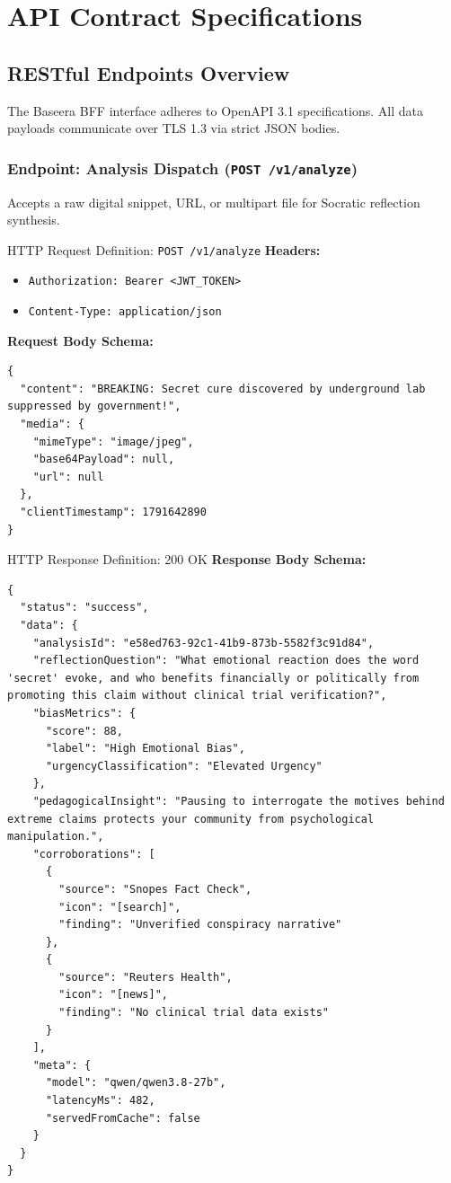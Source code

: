 \documentclass[11pt,a4paper]{report}
\begin{document}
\chapter{API Contract Specifications}

\section{RESTful Endpoints Overview}
The Baseera BFF interface adheres to OpenAPI 3.1 specifications. All data payloads communicate over TLS 1.3 via strict JSON bodies.

\subsection{Endpoint: Analysis Dispatch (\texttt{POST /v1/analyze})}
Accepts a raw digital snippet, URL, or multipart file for Socratic reflection synthesis.

\begin{calloutBox}{HTTP Request Definition: \texttt{POST /v1/analyze}}
\textbf{Headers:}
\begin{itemize}
    \item \texttt{Authorization: Bearer <JWT\_TOKEN>}
    \item \texttt{Content-Type: application/json}
\end{itemize}
\textbf{Request Body Schema:}
\begin{lstlisting}
{
  "content": "BREAKING: Secret cure discovered by underground lab suppressed by government!",
  "media": {
    "mimeType": "image/jpeg",
    "base64Payload": null,
    "url": null
  },
  "clientTimestamp": 1791642890
}
\end{lstlisting}
\end{calloutBox}

\begin{calloutBox}{HTTP Response Definition: 200 OK}
\textbf{Response Body Schema:}
\begin{lstlisting}
{
  "status": "success",
  "data": {
    "analysisId": "e58ed763-92c1-41b9-873b-5582f3c91d84",
    "reflectionQuestion": "What emotional reaction does the word 'secret' evoke, and who benefits financially or politically from promoting this claim without clinical trial verification?",
    "biasMetrics": {
      "score": 88,
      "label": "High Emotional Bias",
      "urgencyClassification": "Elevated Urgency"
    },
    "pedagogicalInsight": "Pausing to interrogate the motives behind extreme claims protects your community from psychological manipulation.",
    "corroborations": [
      {
        "source": "Snopes Fact Check",
        "icon": "[search]",
        "finding": "Unverified conspiracy narrative"
      },
      {
        "source": "Reuters Health",
        "icon": "[news]",
        "finding": "No clinical trial data exists"
      }
    ],
    "meta": {
      "model": "qwen/qwen3.8-27b",
      "latencyMs": 482,
      "servedFromCache": false
    }
  }
}
\end{lstlisting}
\end{calloutBox}
\end{document}
